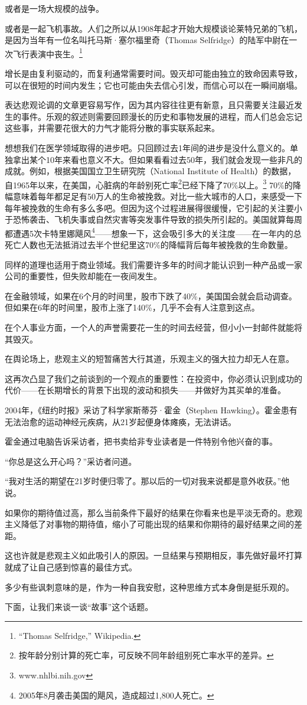 或者是一场大规模的战争。

或者是一起飞机事故。人们之所以从1908年起才开始大规模谈论莱特兄弟的飞机，是因为当年有一位名叫托马斯·塞尔福里奇（Thomas Selfridge）的陆军中尉在一次飞行表演中丧生。\footnote{“Thomas Selfridge,” Wikipedia.}

增长是由复利驱动的，而复利通常需要时间。毁灭却可能由独立的致命因素导致，可以在很短的时间内发生；它也可能由失去信心引发，而信心可以在一瞬间崩塌。

表达悲观论调的文章更容易写作，因为其内容往往更有新意，且只需要关注最近发生的事件。乐观的叙述则需要回顾漫长的历史和事物发展的进程，而人们总会忘记这些事，并需要花很大的力气才能将分散的事实联系起来。

想想我们在医学领域取得的进步吧。只回顾过去1年间的进步是没什么意义的。单独拿出某个10年来看也意义不大。但如果看看过去50年，我们就会发现一些非凡的成就。例如，根据美国国立卫生研究院（National Institute of Health）的数据，自1965年以来，在美国，心脏病的年龄别死亡率\footnote{按年龄分别计算的死亡率，可反映不同年龄组别死亡率水平的差异。}已经下降了70\%以上。\footnote{www.nhlbi.nih.gov} 70\%的降幅意味着每年都足足有50万人的生命被挽救。对比一些大城市的人口，来感受一下每年被挽救的生命有多么多吧。但因为这个过程进展得很缓慢，它引起的关注要小于恐怖袭击、飞机失事或自然灾害等突发事件导致的损失所引起的。美国就算每周都遭遇5次卡特里娜飓风\footnote{2005年8月袭击美国的飓风，造成超过1,800人死亡。}——想象一下，这会吸引多大的关注度——在一年内的总死亡人数也无法抵消过去半个世纪里这70\%的降幅背后每年被挽救的生命数量。

同样的道理也适用于商业领域。我们需要许多年的时间才能认识到一种产品或一家公司的重要性，但失败却能在一夜间发生。

在金融领域，如果在6个月的时间里，股市下跌了40\%，美国国会就会启动调查。但如果在6年的时间里，股市上涨了140\%，几乎不会有人注意到这点。

在个人事业方面，一个人的声誉需要花一生的时间去经营，但小小一封邮件就能将其毁灭。

在舆论场上，悲观主义的短暂痛苦大行其道，乐观主义的强大拉力却无人在意。

这再次凸显了我们之前谈到的一个观点的重要性：在投资中，你必须认识到成功的代价——在长期增长的背景下出现的波动和损失——并做好为其买单的准备。

2004年，《纽约时报》采访了科学家斯蒂芬·霍金（Stephen Hawking）。霍金患有无法治愈的运动神经元疾病，从21岁起便身体瘫痪，无法讲话。

霍金通过电脑告诉采访者，把书卖给非专业读者是一件特别令他兴奋的事。

“你总是这么开心吗？”采访者问道。

“我对生活的期望在21岁时便归零了。那以后的一切对我来说都是意外收获。”他说。

如果你的期待值过高，那么当前条件下最好的结果在你看来也是平淡无奇的。悲观主义降低了对事物的期待值，缩小了可能出现的结果和你期待的最好结果之间的差距。

这也许就是悲观主义如此吸引人的原因。一旦结果与预期相反，事先做好最坏打算就成了让自己感到惊喜的最佳方式。

多少有些讽刺意味的是，作为一种自我安慰，这种思维方式本身倒是挺乐观的。

下面，让我们来谈一谈“故事”这个话题。

